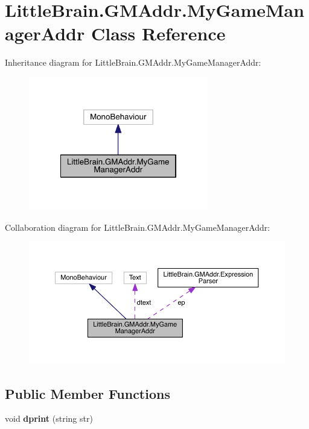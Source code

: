 \hypertarget{class_little_brain_1_1_g_m_addr_1_1_my_game_manager_addr}{}\section{Little\+Brain.\+G\+M\+Addr.\+My\+Game\+Manager\+Addr Class Reference}
\label{class_little_brain_1_1_g_m_addr_1_1_my_game_manager_addr}


Inheritance diagram for Little\+Brain.\+G\+M\+Addr.\+My\+Game\+Manager\+Addr\+:\nopagebreak
\begin{figure}[H]
\begin{center}
\leavevmode
\includegraphics[width=222pt]{class_little_brain_1_1_g_m_addr_1_1_my_game_manager_addr__inherit__graph}
\end{center}
\end{figure}


Collaboration diagram for Little\+Brain.\+G\+M\+Addr.\+My\+Game\+Manager\+Addr\+:\nopagebreak
\begin{figure}[H]
\begin{center}
\leavevmode
\includegraphics[width=350pt]{class_little_brain_1_1_g_m_addr_1_1_my_game_manager_addr__coll__graph}
\end{center}
\end{figure}
\subsection*{Public Member Functions}
\begin{DoxyCompactItemize}
\item 
void {\bfseries dprint} (string str)\hypertarget{class_little_brain_1_1_g_m_addr_1_1_my_game_manager_addr_ad568015fe281b655eea74f58adc6c004}{}\label{class_little_brain_1_1_g_m_addr_1_1_my_game_manager_addr_ad568015fe281b655eea74f58adc6c004}

\end{DoxyCompactItemize}
